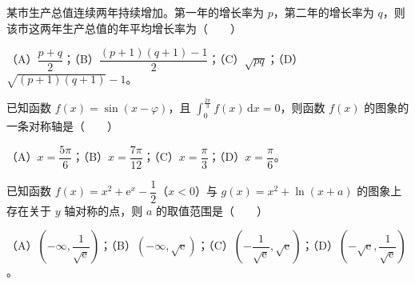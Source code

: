 \begin{question}
某市生产总值连续两年持续增加。第一年的增长率为 $p$，第二年的增长率为 $q$，则该市这两年生产总值的年平均增长率为\mbox{（　　）}

（A）$\dfrac{p+q}2$；（B）$\dfrac{(p+1)(q+1)-1}2$；（C）$\sqrt{pq}$；（D）$\sqrt{(p+1)(q+1)}-1$。

\end{question}
\begin{question}
已知函数 $f(x)=\sin(x-\varphi)$，且 $\displaystyle\int_0^{\frac{2\pi}3}f(x)\,\mathrm dx=0$，则函数 $f(x)$ 的图象的一条对称轴是\mbox{（　　）}

（A）$x=\dfrac{5\pi}6$；（B）$x=\dfrac{7\pi}{12}$；（C）$x=\dfrac\pi3$；（D）$x=\dfrac\pi6$。

\end{question}
\begin{question}
已知函数 $f(x)=x^2+\mathrm e^x-\dfrac12$（$x<0$）与 $g(x)=x^2+\ln(x+a)$ 的图象上存在关于 $y$ 轴对称的点，则 $a$ 的取值范围是\mbox{（　　）}

（A）$\left(-\infty,\dfrac1{\sqrt{\mathrm e}}\right)$；（B）$(-\infty,\sqrt{\mathrm e})$；（C）$\left(-\dfrac1{\sqrt{\mathrm e}},\sqrt{\mathrm e}\right)$；（D）$\left(-\sqrt{\mathrm e},\dfrac1{\sqrt{\mathrm e}}\right)$。

\end{question}

